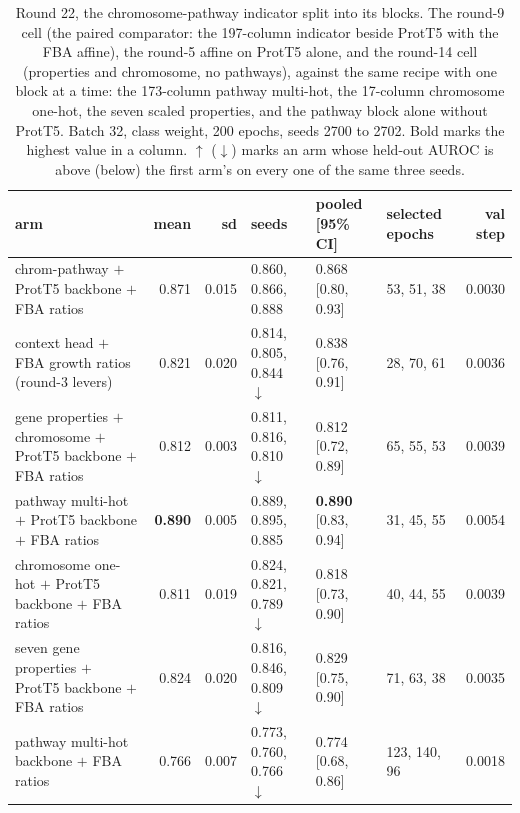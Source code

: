 \begin{table}[H]
  \centering
  \scriptsize
  \setlength{\tabcolsep}{2.5pt}
  \caption[Round 22, the chromosome-pathway indicator split into its blocks]{Round 22, the chromosome-pathway indicator split into its blocks. The round-9 cell (the paired comparator: the 197-column indicator beside ProtT5 with the FBA affine), the round-5 affine on ProtT5 alone, and the round-14 cell (properties and chromosome, no pathways), against the same recipe with one block at a time: the 173-column pathway multi-hot, the 17-column chromosome one-hot, the seven scaled properties, and the pathway block alone without ProtT5. Batch 32, class weight, 200 epochs, seeds 2700 to 2702. Bold marks the highest value in a column. $\uparrow$ ($\downarrow$) marks an arm whose held-out AUROC is above (below) the first arm's on every one of the same three seeds.}
  \label{tab:w38}
  \begin{tabular}{@{}lrrlllr@{}}
    \hline
    arm & mean & sd & seeds & pooled [95\% CI] & selected epochs & val step \\
    \hline
    chrom-pathway $+$ ProtT5 backbone $+$ FBA ratios & 0.871 & 0.015 & 0.860, 0.866, 0.888 & 0.868 [0.80, 0.93] & 53, 51, 38 & 0.0030 \\
    context head $+$ FBA growth ratios (round-3 levers) & 0.821 & 0.020 & 0.814, 0.805, 0.844 $\downarrow$ & 0.838 [0.76, 0.91] & 28, 70, 61 & 0.0036 \\
    gene properties $+$ chromosome $+$ ProtT5 backbone $+$ FBA ratios & 0.812 & 0.003 & 0.811, 0.816, 0.810 $\downarrow$ & 0.812 [0.72, 0.89] & 65, 55, 53 & 0.0039 \\
    pathway multi-hot $+$ ProtT5 backbone $+$ FBA ratios & \textbf{0.890} & 0.005 & 0.889, 0.895, 0.885 & \textbf{0.890} [0.83, 0.94] & 31, 45, 55 & 0.0054 \\
    chromosome one-hot $+$ ProtT5 backbone $+$ FBA ratios & 0.811 & 0.019 & 0.824, 0.821, 0.789 $\downarrow$ & 0.818 [0.73, 0.90] & 40, 44, 55 & 0.0039 \\
    seven gene properties $+$ ProtT5 backbone $+$ FBA ratios & 0.824 & 0.020 & 0.816, 0.846, 0.809 $\downarrow$ & 0.829 [0.75, 0.90] & 71, 63, 38 & 0.0035 \\
    pathway multi-hot backbone $+$ FBA ratios & 0.766 & 0.007 & 0.773, 0.760, 0.766 $\downarrow$ & 0.774 [0.68, 0.86] & 123, 140, 96 & 0.0018 \\
    \hline
  \end{tabular}
\end{table}

